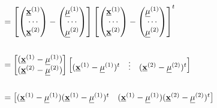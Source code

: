 \documentclass[
]{book}
\theoremstyle{definition}
\theoremstyle{definition}
\theoremstyle{definition}
\theoremstyle{definition}
\theoremstyle{remark}
\begin{document}
\begin{align*}
[(\underline{\mathbf{x}}-\underline{\mu})(\underline{\mathbf{x}}-\underline{\mu})^t]\\
&\hspace{-3.5cm}=
  \begin{bmatrix}
\begin{pmatrix}
\underline{\mathbf{x}}^{(1)} \\ \cdots \\ \underline{\mathbf{x}}^{(2)}
\end{pmatrix}- \begin{pmatrix}
\underline{\mu}^{(1)} \\ \cdots \\ \underline{\mu}^{(2)}
\end{pmatrix}
\end{bmatrix}\begin{bmatrix}
\begin{pmatrix}
\underline{\mathbf{x}}^{(1)} \\ \cdots \\ \underline{\mathbf{x}}^{(2)}
\end{pmatrix}- \begin{pmatrix}
\underline{\mu}^{(1)} \\ \cdots \\ \underline{\mu}^{(2)}
\end{pmatrix}
\end{bmatrix}^{t}\\ \\
&\hspace{-3.5cm}=
  \begin{bmatrix}
( \underline{\mathbf{x}}^{(1)}-\underline{\mu}^{(1)} ) \\
( \underline{\mathbf{x}}^{(2)}-\underline{\mu}^{(2)} )
\end{bmatrix}
\begin{bmatrix}
( \underline{\mathbf{x}}^{(1)}-\underline{\mu}^{(1)} )^t & \vdots &
  ( \underline{\mathbf{x}}^{(2)}-\underline{\mu}^{(2)} )^t
\end{bmatrix}\\ \\
&\hspace{-3.5cm}=
  \begin{bmatrix}
( \underline{\mathbf{x}}^{(1)}-\underline{\mu}^{(1)} )
( \underline{\mathbf{x}}^{(1)}-\underline{\mu}^{(1)} )^t &
  ( \underline{\mathbf{x}}^{(1)}-\underline{\mu}^{(1)} )
( \underline{\mathbf{x}}^{(2)}-\underline{\mu}^{(2)} )^t \\

\end{bmatrix}
\end{align*}
\end{document}
